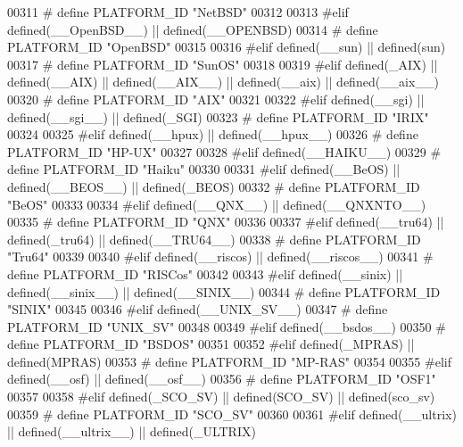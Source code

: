 \begin{DoxyCode}
{{{{{{{{{{{{{{{{{{{{{{{{{{{{{{{{{{{{00311 \textcolor{preprocessor}{# define PLATFORM\_ID "NetBSD"}
00312 
00313 \textcolor{preprocessor}{#elif defined(\_\_OpenBSD\_\_) || defined(\_\_OPENBSD)}
00314 \textcolor{preprocessor}{# define PLATFORM\_ID "OpenBSD"}
00315 
00316 \textcolor{preprocessor}{#elif defined(\_\_sun) || defined(sun)}
00317 \textcolor{preprocessor}{# define PLATFORM\_ID "SunOS"}
00318 
00319 \textcolor{preprocessor}{#elif defined(\_AIX) || defined(\_\_AIX) || defined(\_\_AIX\_\_) || defined(\_\_aix) || defined(\_\_aix\_\_)}
00320 \textcolor{preprocessor}{# define PLATFORM\_ID "AIX"}
00321 
00322 \textcolor{preprocessor}{#elif defined(\_\_sgi) || defined(\_\_sgi\_\_) || defined(\_SGI)}
00323 \textcolor{preprocessor}{# define PLATFORM\_ID "IRIX"}
00324 
00325 \textcolor{preprocessor}{#elif defined(\_\_hpux) || defined(\_\_hpux\_\_)}
00326 \textcolor{preprocessor}{# define PLATFORM\_ID "HP-UX"}
00327 
00328 \textcolor{preprocessor}{#elif defined(\_\_HAIKU\_\_)}
00329 \textcolor{preprocessor}{# define PLATFORM\_ID "Haiku"}
00330 
00331 \textcolor{preprocessor}{#elif defined(\_\_BeOS) || defined(\_\_BEOS\_\_) || defined(\_BEOS)}
00332 \textcolor{preprocessor}{# define PLATFORM\_ID "BeOS"}
00333 
00334 \textcolor{preprocessor}{#elif defined(\_\_QNX\_\_) || defined(\_\_QNXNTO\_\_)}
00335 \textcolor{preprocessor}{# define PLATFORM\_ID "QNX"}
00336 
00337 \textcolor{preprocessor}{#elif defined(\_\_tru64) || defined(\_tru64) || defined(\_\_TRU64\_\_)}
00338 \textcolor{preprocessor}{# define PLATFORM\_ID "Tru64"}
00339 
00340 \textcolor{preprocessor}{#elif defined(\_\_riscos) || defined(\_\_riscos\_\_)}
00341 \textcolor{preprocessor}{# define PLATFORM\_ID "RISCos"}
00342 
00343 \textcolor{preprocessor}{#elif defined(\_\_sinix) || defined(\_\_sinix\_\_) || defined(\_\_SINIX\_\_)}
00344 \textcolor{preprocessor}{# define PLATFORM\_ID "SINIX"}
00345 
00346 \textcolor{preprocessor}{#elif defined(\_\_UNIX\_SV\_\_)}
00347 \textcolor{preprocessor}{# define PLATFORM\_ID "UNIX\_SV"}
00348 
00349 \textcolor{preprocessor}{#elif defined(\_\_bsdos\_\_)}
00350 \textcolor{preprocessor}{# define PLATFORM\_ID "BSDOS"}
00351 
00352 \textcolor{preprocessor}{#elif defined(\_MPRAS) || defined(MPRAS)}
00353 \textcolor{preprocessor}{# define PLATFORM\_ID "MP-RAS"}
00354 
00355 \textcolor{preprocessor}{#elif defined(\_\_osf) || defined(\_\_osf\_\_)}
00356 \textcolor{preprocessor}{# define PLATFORM\_ID "OSF1"}
00357 
00358 \textcolor{preprocessor}{#elif defined(\_SCO\_SV) || defined(SCO\_SV) || defined(sco\_sv)}
00359 \textcolor{preprocessor}{# define PLATFORM\_ID "SCO\_SV"}
00360 
00361 \textcolor{preprocessor}{#elif defined(\_\_ultrix) || defined(\_\_ultrix\_\_) || defined(\_ULTRIX)}
}}}}}}}}}}}}}}}}}}}}}}}}}}}}}}}}}}}}
\end{DoxyCode}
